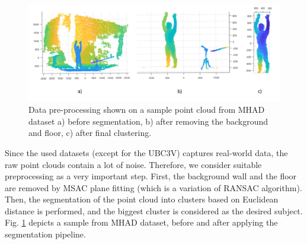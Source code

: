 
\vspace{5mm}

\begin{figure}[H]
\begin{center}
  \includegraphics[width=\textwidth]{images/implementation/mhad.png}
  \caption[Data pre-processing shown on a sample point cloud from MHAD dataset \cite{Vidal:2013:BMC:2478277.2478412}.]{ Data pre-processing shown on a sample point cloud from MHAD dataset \cite{Vidal:2013:BMC:2478277.2478412} a) before segmentation, b) after removing the background and floor, c) after final clustering.}
  \label{fig:mhad}
\end{center}
\end{figure}

\noindent
Since the used datasets (except for the UBC3V) captures real-world data, the raw point clouds contain a lot of noise. Therefore, we consider suitable preprocessing as a very important step. First, the background wall and the floor are removed by MSAC plane fitting (which is a variation of RANSAC algorithm). Then, the segmentation of the point cloud into clusters based on Euclidean distance is performed, and the biggest cluster is considered as the desired subject. Fig. \ref{fig:mhad} depicts a sample from MHAD dataset, before and after applying the segmentation pipeline.%
\par

